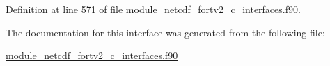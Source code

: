 Definition at line 571 of file module\+\_\+netcdf\+\_\+fortv2\+\_\+c\+\_\+interfaces.\+f90.



The documentation for this interface was generated from the following file\+:\begin{DoxyCompactItemize}
\item 
\hyperlink{module__netcdf__fortv2__c__interfaces_8f90}{module\+\_\+netcdf\+\_\+fortv2\+\_\+c\+\_\+interfaces.\+f90}\end{DoxyCompactItemize}
